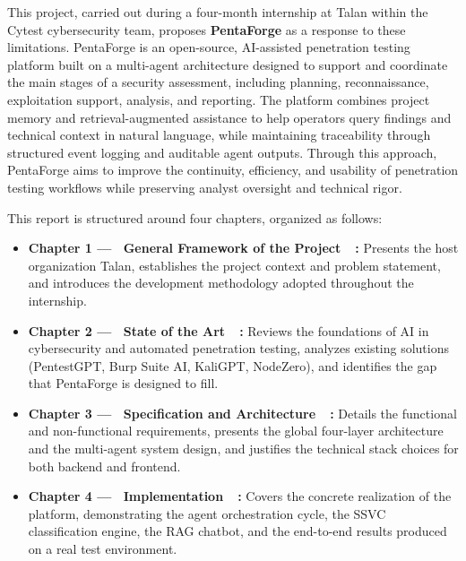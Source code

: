 \documentclass[12pt,a4paper]{report}
\begin{document}
\vspace{0.8cm}

This project, carried out during a four-month internship at Talan within the Cytest
cybersecurity team, proposes \textbf{PentaForge} as a response to these limitations.
PentaForge is an open-source, AI-assisted penetration testing platform built on a
multi-agent architecture designed to support and coordinate the main stages of a security
assessment, including planning, reconnaissance, exploitation support, analysis, and
reporting. The platform combines project memory and retrieval-augmented assistance to
help operators query findings and technical context in natural language, while
maintaining traceability through structured event logging and auditable agent outputs.
Through this approach, PentaForge aims to improve the continuity, efficiency, and
usability of penetration testing workflows while preserving analyst oversight and
technical rigor.

\vspace{0.8cm}

This report is structured around four chapters, organized as follows:

\vspace{0.4cm}

\begin{itemize}
    \setlength{\itemsep}{0.5cm}
    \item \textbf{Chapter 1 --- \guillemotleft~General Framework of the Project~\guillemotright~:}
    Presents the host organization Talan, establishes the project context and problem
    statement, and introduces the development methodology adopted throughout the internship.

    \item \textbf{Chapter 2 --- \guillemotleft~State of the Art~\guillemotright~:}
    Reviews the foundations of AI in cybersecurity and automated penetration testing,
    analyzes existing solutions (PentestGPT, Burp Suite AI, KaliGPT, NodeZero), and
    identifies the gap that PentaForge is designed to fill.

    \item \textbf{Chapter 3 --- \guillemotleft~Specification and Architecture~\guillemotright~:}
    Details the functional and non-functional requirements, presents the global
    four-layer architecture and the multi-agent system design, and justifies the
    technical stack choices for both backend and frontend.

    \item \textbf{Chapter 4 --- \guillemotleft~Implementation~\guillemotright~:}
    Covers the concrete realization of the platform, demonstrating the agent
    orchestration cycle, the SSVC classification engine, the RAG chatbot, and the
    end-to-end results produced on a real test environment.
\end{itemize}
\end{document}

